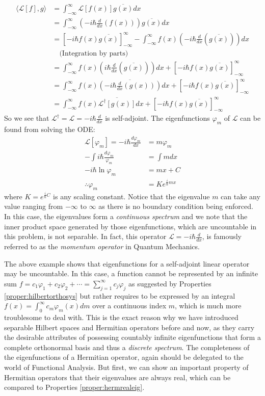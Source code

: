 \begin{solution}
\begin{align*}
\langle \mathcal{L}[f], g \rangle &= \int_{-\infty}^\infty \mathcal{L}[f(x)] \overline{g(x)} dx \\
&= \int_{-\infty}^\infty \left(-i \hbar\frac{d}{dx}(f(x))\right) \overline{g(x)} dx \\
&= [-i\hbar f(x)\overline{g(x)}]_{-\infty}^\infty - \int_{-\infty}^\infty f(x) \left(-i\hbar\frac{d}{dx}(\overline{g(x)})\right) dx \\
&\quad \text{(Integration by parts)} \\
&= \int_{-\infty}^\infty f(x) \left(i\hbar\frac{d}{dx}(\overline{g(x)})\right) dx + [-i\hbar f(x)\overline{g(x)}]_{-\infty}^\infty \\
&= \int_{-\infty}^\infty f(x) \overline{\left(-i\hbar\frac{d}{dx}(g(x))\right)} dx + [-i\hbar f(x)\overline{g(x)}]_{-\infty}^\infty \\
&= \int_{-\infty}^\infty f(x) \overline{\mathcal{L}^\dag[g(x)]} dx + [-i\hbar f(x)\overline{g(x)}]_{-\infty}^\infty
\end{align*}
So we see that $\mathcal{L}^\dag = \mathcal{L} = -i\hbar\frac{d}{dx}$ is self-adjoint. The eigenfunctions $\varphi_m$ of $\mathcal{L}$ can be found from solving the ODE:
\begin{align*}
\mathcal{L}[\varphi_m] = -i \hbar\frac{d\varphi_m}{dx} &= m\varphi_m \\
-\int i \hbar \frac{d\varphi_m}{\varphi_m} &= \int m dx \\
- i \hbar \ln{\varphi_m} &= mx + C \\
\therefore \varphi_m &= Ke^{\frac{i}{\hbar}mx}
\end{align*}
where $K = e^{\frac{i}{\hbar} C}$ is any scaling constant. Notice that the eigenvalue $m$ can take any value ranging from $-\infty$ to $\infty$ as there is no boundary condition being enforced. In this case, the eigenvalues form a \textit{continuous spectrum} and we note that the inner product space generated by those eigenfunctions, which are uncountable in this problem, is not separable. In fact, this operator $\mathcal{L} = -i\hbar\frac{d}{dx}$, is famously referred to as the \textit{momentum operator} in Quantum Mechanics.
\end{solution}
The above example shows that eigenfunctions for a self-adjoint linear operator may be uncountable. In this case, a function cannot be represented by an infinite sum $f = c_1\varphi_1 + c_2\varphi_2 + \cdots = \sum_{j=1}^{\infty} c_j \varphi_j$ as suggested by Properties \ref{proper:hilbertorthosys} but rather requires to be expressed by an integral $f(x) = \int_0^\infty c_m\varphi_m(x) dm$ over a continuous index $m$, which is much more troublesome to deal with. This is the exact reason why we have introduced separable Hilbert spaces and Hermitian operators before and now, as they carry the desirable attributes of possessing countably infinite eigenfunctions that form a complete orthonormal basis and thus a \textit{discrete spectrum}. The completeness of the eigenfunctions of a Hermitian operator, again should be delegated to the world of Functional Analysis. But first, we can show an important property of Hermitian operators that their eigenvalues are always real, which can be compared to Properties \ref{proper:hermrealeig}.
